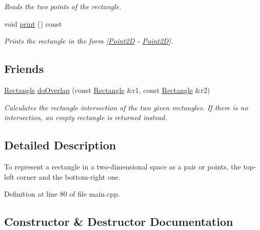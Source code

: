 \begin{DoxyCompactItemize}
\begin{DoxyCompactList}\small\item\em Reads the two points of the rectangle. \end{DoxyCompactList}\item 
void \hyperlink{classRectangle_a035d467554bf71dc8e47ad601bbb1294}{print} () const \hypertarget{classRectangle_a035d467554bf71dc8e47ad601bbb1294}{}\label{classRectangle_a035d467554bf71dc8e47ad601bbb1294}

\begin{DoxyCompactList}\small\item\em Prints the rectangle in the form \mbox{[}\hyperlink{classPoint2D}{Point2D} -\/ \hyperlink{classPoint2D}{Point2D}\mbox{]}. \end{DoxyCompactList}\end{DoxyCompactItemize}
\subsection*{Friends}
\begin{DoxyCompactItemize}
\item 
\hyperlink{classRectangle}{Rectangle} \hyperlink{classRectangle_a888d2b0113947b4461107bb02b28799d}{do\+Overlap} (const \hyperlink{classRectangle}{Rectangle} \&r1, const \hyperlink{classRectangle}{Rectangle} \&r2)
\begin{DoxyCompactList}\small\item\em Calculates the rectangle intersection of the two given rectangles. If there is no intersection, an empty rectangle is returned instead. \end{DoxyCompactList}\end{DoxyCompactItemize}


\subsection{Detailed Description}
To represent a rectangle in a two-\/dimensional space as a pair or points, the top-\/left corner and the bottom-\/right one. 

Definition at line 80 of file main.\+cpp.



\subsection{Constructor \& Destructor Documentation}
